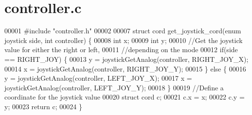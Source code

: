 \section{controller.\+c}
\label{controller_8c_source}

\begin{DoxyCode}
00001 \textcolor{preprocessor}{#include "controller.h"}
00002 
00007 \textcolor{keyword}{struct }cord get_joystick_cord(enum joystick side, int controller) \{
00008   \textcolor{keywordtype}{int} x;
00009   \textcolor{keywordtype}{int} y;
00010   \textcolor{comment}{//Get the joystick value for either the right or left,}
00011   \textcolor{comment}{//depending on the mode}
00012   \textcolor{keywordflow}{if}(side == RIGHT_JOY) \{
00013     y = joystickGetAnalog(controller, RIGHT_JOY_X);
00014     x = joystickGetAnalog(controller, RIGHT_JOY_Y);
00015   \} \textcolor{keywordflow}{else} \{
00016     y = joystickGetAnalog(controller, LEFT_JOY_X);
00017     x = joystickGetAnalog(controller, LEFT_JOY_Y);
00018   \}
00019   \textcolor{comment}{//Define a coordinate for the joystick value}
00020   \textcolor{keyword}{struct }cord c;
00021   c.x = x;
00022   c.y = y;
00023   \textcolor{keywordflow}{return} c;
00024 \}
\end{DoxyCode}
